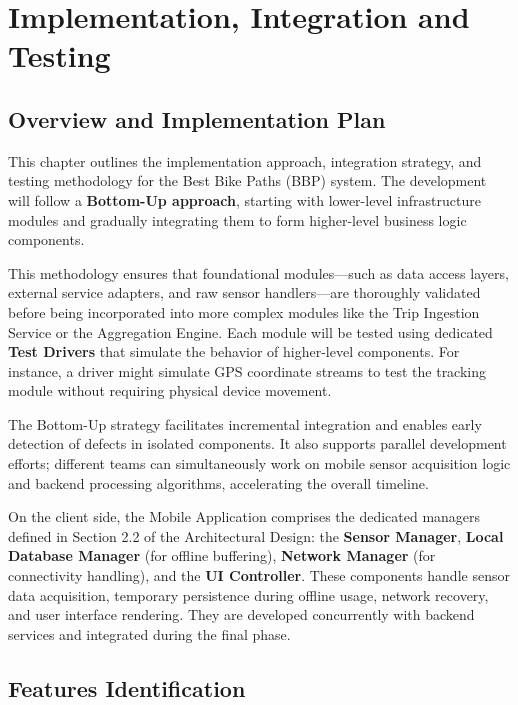 \chapter{Implementation, Integration and Testing}
\label{ch:implementation-integration-and-testing}

\section{Overview and Implementation Plan}
\label{sec:overview-and-implementation-plan}

This chapter outlines the implementation approach, integration strategy, and testing methodology for the Best Bike Paths (BBP) system. The development will follow a \textbf{Bottom-Up approach}, starting with lower-level infrastructure modules and gradually integrating them to form higher-level business logic components.

This methodology ensures that foundational modules—such as data access layers, external service adapters, and raw sensor handlers—are thoroughly validated before being incorporated into more complex modules like the Trip Ingestion Service or the Aggregation Engine. Each module will be tested using dedicated \textbf{Test Drivers} that simulate the behavior of higher-level components. For instance, a driver might simulate GPS coordinate streams to test the tracking module without requiring physical device movement.

The Bottom-Up strategy facilitates incremental integration and enables early detection of defects in isolated components. It also supports parallel development efforts; different teams can simultaneously work on mobile sensor acquisition logic and backend processing algorithms, accelerating the overall timeline.

On the client side, the Mobile Application comprises the dedicated managers defined in Section 2.2 of the Architectural Design: the \textbf{Sensor Manager}, \textbf{Local Database Manager} (for offline buffering), \textbf{Network Manager} (for connectivity handling), and the \textbf{UI Controller}. These components handle sensor data acquisition, temporary persistence during offline usage, network recovery, and user interface rendering. They are developed concurrently with backend services and integrated during the final phase.

\section{Features Identification}
\label{sec:features-identification}

